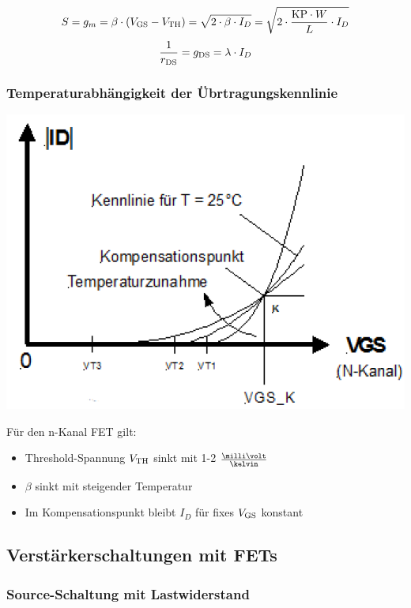 $$ S = g_m = \beta \cdot (V_{\rm GS} - V_{\rm TH}) = \sqrt{2 \cdot \beta \cdot I_D} = \sqrt{ 2 \cdot \frac{\mathrm{KP} \cdot W}{L} \cdot I_D} $$
$$ \frac{1}{r_{\rm DS}} = g_{\rm DS} = \lambda \cdot I_D $$


\subsubsection{Temperaturabhängigkeit der Übrtragungskennlinie}

\begin{minipage}[c]{0.4\columnwidth}
    \includegraphics[width= \columnwidth]{images/mos_fet_eingangskennlinie_temperatur.png}
\end{minipage}
\hfill
\begin{minipage}[c]{0.58\columnwidth}
    Für den n-Kanal FET gilt:
    \begin{itemize}
        \item Threshold-Spannung $V_{\rm TH}$ sinkt mit 1-2 $\frac{\milli \volt}{\kelvin}$
        \item $\beta$ sinkt mit steigender Temperatur
        \item Im Kompensationspunkt bleibt $I_D$ für fixes $V_{\rm GS}$ konstant
    \end{itemize}
\end{minipage}

    
\subsection{Verstärkerschaltungen mit FETs}

\subsubsection{Source-Schaltung mit Lastwiderstand}


